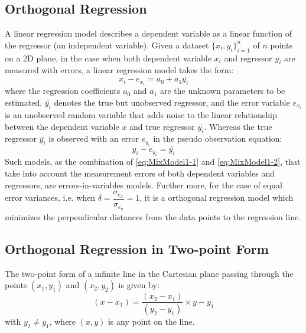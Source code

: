 \subsection{Orthogonal Regression}
\label{subsec:OrthogonalRegression}
A linear regression model describes a dependent variable as a linear function of the regressor (an independent variable). Given a dataset $\{x_i,y_i\}^n_{i=1}$ of $n$ points on a 2D plane, in the case when both dependent variable $x_i$ and regressor $y_i$ are measured with errors, a linear regression model takes the form:
\begin{equation} \label{eq:MixModel1-1}
x_i - e_{x_i} = %
a_0 + a_1\bar{y_i}
\end{equation}
where the regression coefficients $a_0$ and $a_1$ are the unknown parameters to be estimated, $\bar{y_i}$ denotes the true but unobserved regressor, and the error variable $e_{x_i}$ is an unobserved random variable that adds noise to the linear relationship between the dependent variable $x$ and true regressor $\bar{y_i}$. Whereas the true regressor $\bar{y_i}$ is observed with an error $e_{y_i}$ in the pseudo observation equation:
\begin{equation} \label{eq:MixModel1-2}
y_i-e_{y_i} = \bar{y_i}
\end{equation}
Such models, as the combination of \eqref{eq:MixModel1-1} and \eqref{eq:MixModel1-2}, that take into account the measurement errors of both dependent variables and regressors, are errors-in-variables models. Further more, for the case of equal error variances, i.e. when $\delta=\dfrac{\sigma_{e_x}}{\sigma_{e_y}}=1$, it is a orthogonal regression model which minimizes the %
perpendicular distances from the data points to the regression line.


\subsection{Orthogonal Regression in Two-point Form}
\label{subsec:NonLinear}

The two-point form of a infinite line in the Cartesian plane passing through the points $(x_1,y_1)$ and $(x_2,y_2)$ is given by:
\begin{equation} \label{eq:LineInTwoPointForm}
(x-x_1) = \dfrac{(x_2-x_1)}{(y_2-y_1)}\times y-y_1
\end{equation}
with $y_2\neq y_1$, where $(x,y)$ is any point on the line.


